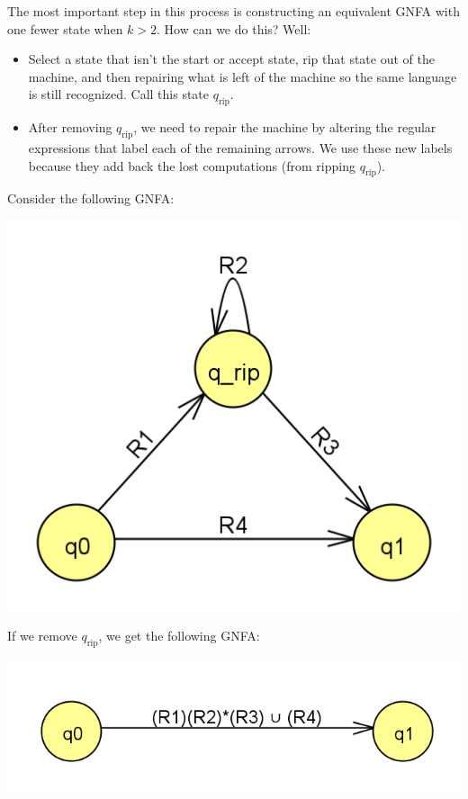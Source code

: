 \documentclass[letterpaper]{article}
\begin{document}
The most important step in this process is constructing an equivalent GNFA with one fewer state when $k > 2$. How can we do this? Well: 
\begin{itemize}
    \item Select a state that isn't the start or accept state, rip that state out of the machine, and then repairing what is left of the machine so the same language is still recognized. Call this state $q_{\text{rip}}$.
    \item After removing $q_{\text{rip}}$, we need to repair the machine by altering the regular expressions that label each of the remaining arrows. We use these new labels because they add back the lost computations (from ripping $q_{\text{rip}}$). 
\end{itemize}
Consider the following GNFA: 
\begin{center}
    \includegraphics[scale=0.4]{../assets/gnfa_before.png}
\end{center}
If we remove $q_{\text{rip}}$, we get the following GNFA: 
\begin{center}
    \includegraphics[scale=0.4]{../assets/gnfa_after.png}
\end{center}
\end{document}
